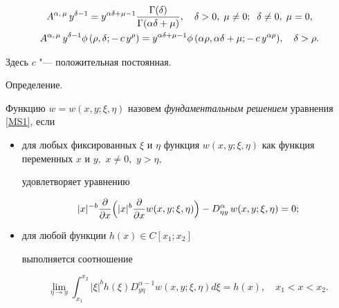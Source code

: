\begin{gather}

\label{Ay^{delta-1}}

A^{\alpha,\, \mu}\,y^{\delta-1}=

y^{\alpha\delta+\mu-1}\frac{\Gamma(\delta)}{\Gamma(\alpha\delta+\mu)}, \quad  \delta>0, \; \mu\neq 0; \; \; \delta\neq 0, \; \mu= 0,

\\

\label{ARight}

A^{\alpha,\, \mu}\,y^{\delta-1}\phi\,(\rho,\delta;-\,c\,y^{\rho})=

y^{\alpha\delta+\mu-1} \phi\,(\alpha\rho,\alpha\delta+\mu;-\,c\,y^{\alpha\rho}), \quad  \delta>\rho.

\end{gather}

Здесь $c$ "--- положительная постоянная.



\smallskip







{\small \sc Определение.}

Функцию $w=w(x,y;\xi,\eta)$ назовем {\it фундаментальным решением} уравнения \eqref{MS1}, если

\begin{itemize}

\item[1)] для любых фиксированных $\xi$ и $\eta$ функция $w(x,y;\xi,\eta)$ как функция переменных $x$ и $y,$ $x\neq 0,$ $y>\eta,$

удовлетворяет уравнению

$$

|x|^{-b} \frac{\partial}{\partial x}\Bigl(|x|^{b}\frac{\partial}{\partial x}

w(x,y;\xi,\eta)\Bigr)-

D^{\alpha}_{\eta y}\,w(x,y;\xi,\eta)=0;

$$

\item[2)] для любой функции $h(x)\in C[x_1;x_2]$ 

выполняется соотношение

\begin{equation}

\label{Glava-2-1-(4)}

\lim_{\eta \to y} \int _{x_1}^{x_2}

|\xi|^{b} h(\xi) D^{\alpha-1}_{y\eta}w(x,y;\xi,\eta) d\xi=h(x), \quad  x_1 < x < x_2.

\end{equation}





\end{itemize}



